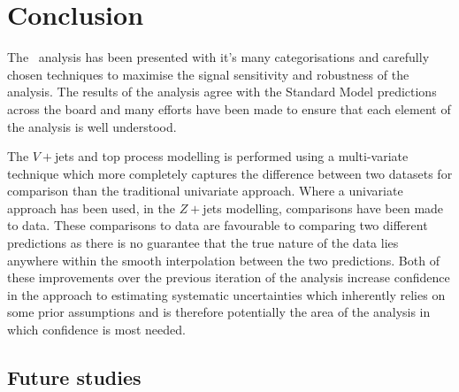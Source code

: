 \chapter{Conclusion}%
\label{ch:conclusion}
The \VHbb\ analysis has been presented with it's many categorisations and
carefully chosen techniques to maximise the signal sensitivity and robustness of
the analysis. The results of the analysis agree with the Standard Model
predictions across the board and many efforts have been made to ensure that each
element of the analysis is well understood.

The $V+$jets and top process modelling is performed using a multi-variate
technique which more completely captures the difference between two datasets for
comparison than the traditional univariate approach. Where a univariate
approach has been used, in the $Z+$jets modelling, comparisons have been made to
data. These comparisons to data are favourable to comparing two different
predictions as there is no guarantee that the true nature of the data lies
anywhere within the smooth interpolation between the two predictions. Both of
these improvements over the previous iteration of the analysis increase
confidence in the approach to estimating systematic uncertainties which
inherently relies on some prior assumptions and is therefore potentially the
area of the analysis in which confidence is most needed.




\section{Future studies}%
\label{sec:future}

